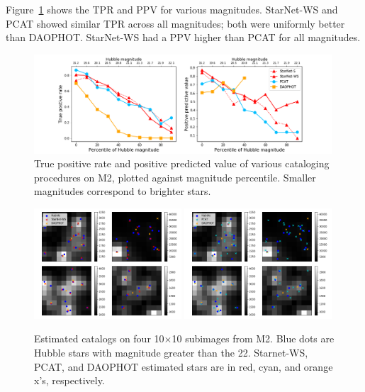 Figure~\ref{fig:summary_stats} shows the TPR and PPV for various magnitudes.
StarNet-WS and PCAT showed similar TPR across all magnitudes; both were
uniformly better than DAOPHOT. StarNet-WS had a PPV higher than PCAT for all magnitudes. 
\begin{figure}[ht]
    \centering
    \includegraphics[width=0.99\textwidth]{figures/summary_statistics_m2.png}
    \caption{True positive rate and positive predicted value of various cataloging
    procedures on M2, plotted against magnitude percentile.
    Smaller magnitudes correspond to brighter stars. }
    \label{fig:summary_stats}
\end{figure}

\begin{figure}[H]
    \centering
    \includegraphics[width=0.49\textwidth]{figures/example_subimages_ws.png}
    \includegraphics[width=0.49\textwidth]{figures/example_subimages_pcat.png}
    \caption{Estimated catalogs on four 10$\times$10 subimages from
    M2. Blue dots are Hubble stars with magnitude greater than the 22.
    Starnet-WS, PCAT, and DAOPHOT estimated stars are in
    red, cyan, and orange x's, respectively. }
    \label{fig:example_subimages}
\end{figure}

